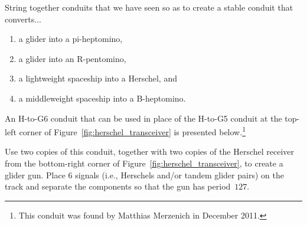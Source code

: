 \begin{multicols}{2}
	
	\mfilbreak
	
	
	\begin{problem}\label{exer:composite_converters} 
		String together conduits that we have seen so as to create a stable conduit that converts...\smallskip
		
		\begin{enumerate}[label=\bf\color{ocre}(\alph*)]
			\item a glider into a pi-heptomino,
			
			\item a glider into an R-pentomino,
			
			\item a lightweight spaceship into a Herschel, and
			
			\item a middleweight spaceship into a B-heptomino.
		\end{enumerate}
	\end{problem}
	
	
	\mfilbreak
	
	
	\begin{problem}\label{exer:h_to_g6} 
		An H-to-G6 conduit that can be used in place of the H-to-G5 conduit at the top-left corner of Figure~\ref{fig:herschel_transceiver} is presented below.\footnote{This conduit was found by Matthias Merzenich in December 2011.}
		
		\begin{center}
		\end{center}
		
		\noindent Use two copies of this conduit, together with two copies of the Herschel receiver from the bottom-right corner of Figure~\ref{fig:herschel_transceiver}, to create a glider gun. Place $6$ signals (i.e., Herschels and/or tandem glider pairs) on the track and separate the components so that the gun has period~$127$.
	\end{problem}
	

\end{multicols}
